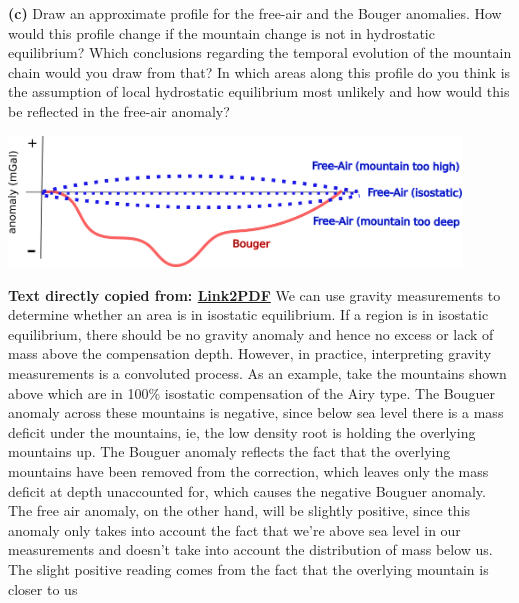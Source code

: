 \textbf{(c)} Draw an approximate profile for the free-air and the Bouger anomalies. How would this profile change if the mountain change is not in hydrostatic equilibrium? Which conclusions regarding the temporal evolution of the mountain chain would you draw from that? In which areas along this profile do you think is the assumption of local hydrostatic equilibrium most unlikely and how would this be reflected in the free-air anomaly?
\ifanswers
  \begin{tcolorbox}[enhanced jigsaw,breakable,pad at break*=1mm,
    colback=blue!5!white,colframe=babyblueeyes,title=Solutions]
    \begin{center}
    \includegraphics[width=0.9\textwidth]{Figures/Gravimetry/SolutionsProfiles.png}
    \end{center}
    \textbf{Text directly copied from: \href{https://www.geology.cwu.edu/facstaff/tim/TEACHING/Geophysics/gravity_geoid.pdf}{Link2PDF}}
    We can use gravity measurements to determine whether an area is in isostatic equilibrium. If a region is in isostatic equilibrium, there should be no gravity anomaly and hence no excess or lack of mass above the compensation depth. However, in practice, interpreting gravity measurements is a convoluted process. As an example, take the mountains shown above which are in 100\% isostatic compensation of the Airy type. The Bouguer anomaly across these mountains is negative, since below sea level there is a mass deficit under the mountains, ie, the low density root is holding the overlying mountains up. The Bouguer
    anomaly reflects the fact that the overlying mountains have been removed from the correction, which leaves only the mass deficit at depth unaccounted for, which causes the negative Bouguer anomaly. The free air anomaly, on the other hand, will be slightly positive, since this anomaly only takes into account the fact that we’re above sea level in our measurements and doesn’t take into account the distribution of mass below us. The slight positive reading comes from the fact that the overlying mountain is closer to us

\end{tcolorbox}
